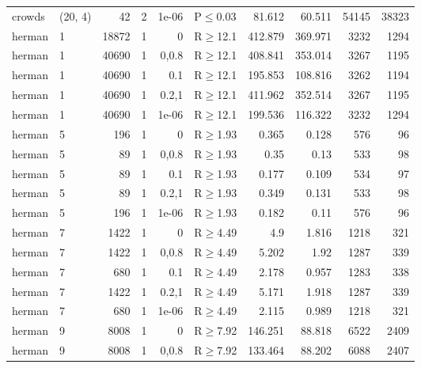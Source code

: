 \begin{longtable}{llrrrlrrrr}
 crowds        & (20, 4)  &     	42 &   2 & 1e-06 & P$\leq$0.03  & 81.612   & 60.511   & 54145   & 38323   \\
 herman        & 1        &  	18872 &   1 & 0     & R$\geq$12.1  & 412.879  & 369.971  & 3232    & 1294    \\
 herman        & 1        &  	40690 &   1 & 0,0.8 & R$\geq$12.1  & 408.841  & 353.014  & 3267    & 1195    \\
 herman        & 1        &  	40690 &   1 & 0.1   & R$\geq$12.1  & 195.853  & 108.816  & 3262    & 1194    \\
 herman        & 1        &  	40690 &   1 & 0.2,1 & R$\geq$12.1  & 411.962  & 352.514  & 3267    & 1195    \\
 herman        & 1        &  	40690 &   1 & 1e-06 & R$\geq$12.1  & 199.536  & 116.322  & 3232    & 1294    \\
 herman        & 5        &    	196 &   1 & 0     & R$\geq$1.93  & 0.365    & 0.128    & 576     & 96      \\
 herman        & 5        &     	89 &   1 & 0,0.8 & R$\geq$1.93  & 0.35     & 0.13     & 533     & 98      \\
 herman        & 5        &     	89 &   1 & 0.1   & R$\geq$1.93  & 0.177    & 0.109    & 534     & 97      \\
 herman        & 5        &     	89 &   1 & 0.2,1 & R$\geq$1.93  & 0.349    & 0.131    & 533     & 98      \\
 herman        & 5        &    	196 &   1 & 1e-06 & R$\geq$1.93  & 0.182    & 0.11     & 576     & 96      \\
 herman        & 7        &   	1422 &   1 & 0     & R$\geq$4.49  & 4.9      & 1.816    & 1218    & 321     \\
 herman        & 7        &   	1422 &   1 & 0,0.8 & R$\geq$4.49  & 5.202    & 1.92     & 1287    & 339     \\
 herman        & 7        &    	680 &   1 & 0.1   & R$\geq$4.49  & 2.178    & 0.957    & 1283    & 338     \\
 herman        & 7        &   	1422 &   1 & 0.2,1 & R$\geq$4.49  & 5.171    & 1.918    & 1287    & 339     \\
 herman        & 7        &    	680 &   1 & 1e-06 & R$\geq$4.49  & 2.115    & 0.989    & 1218    & 321     \\
 herman        & 9        &   	8008 &   1 & 0     & R$\geq$7.92  & 146.251  & 88.818   & 6522    & 2409    \\
 herman        & 9        &   	8008 &   1 & 0,0.8 & R$\geq$7.92  & 133.464  & 88.202   & 6088    & 2407    \\

\end{longtable}

